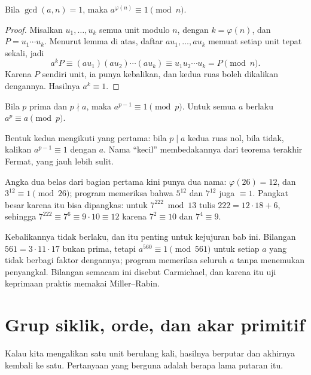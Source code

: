 \begin{teorema}[Euler]
Bila $\gcd(a,n)=1$, maka $a^{\varphi(n)}\equiv1\pmod n$.
\end{teorema}

\begin{proof}
Misalkan $u_1,\dots,u_k$ semua unit modulo $n$, dengan $k=\varphi(n)$, dan $P=u_1\cdots u_k$.
Menurut lemma di atas, daftar $au_1,\dots,au_k$ memuat setiap unit tepat sekali, jadi
\[
a^kP\equiv(au_1)(au_2)\cdots(au_k)\equiv u_1u_2\cdots u_k=P\pmod n .
\]
Karena $P$ sendiri unit, ia punya kebalikan, dan kedua ruas boleh dikalikan dengannya.
Hasilnya $a^k\equiv1$.
\end{proof}

\begin{akibat}
Bila $p$ prima dan $p\nmid a$, maka $a^{p-1}\equiv1\pmod p$. Untuk semua $a$ berlaku
$a^p\equiv a\pmod p$.
\end{akibat}

Bentuk kedua mengikuti yang pertama: bila $p\mid a$ kedua ruas nol, bila tidak, kalikan
$a^{p-1}\equiv1$ dengan $a$. Nama ``kecil'' membedakannya dari teorema terakhir Fermat, yang jauh lebih sulit.

Angka dua belas dari bagian pertama kini punya dua nama: $\varphi(26)=12$, dan
$3^{12}\equiv1\pmod{26}$; program memeriksa bahwa $5^{12}$ dan $7^{12}$ juga $\equiv1$.
Pangkat besar karena itu bisa dipangkas: untuk $7^{222}\bmod13$ tulis $222=12\cdot18+6$,
sehingga $7^{222}\equiv7^6\equiv9\cdot10\equiv12$ karena $7^2\equiv10$ dan $7^4\equiv9$.

Kebalikannya tidak berlaku, dan itu penting untuk kejujuran bab ini. Bilangan $561=3\cdot11\cdot17$
bukan prima, tetapi $a^{560}\equiv1\pmod{561}$ untuk setiap $a$ yang tidak berbagi faktor
dengannya; program memeriksa seluruh $a$ tanpa menemukan penyangkal. Bilangan semacam ini
disebut Carmichael, dan karena itu uji keprimaan praktis memakai Miller--Rabin.


\section{Grup siklik, orde, dan akar primitif}

Kalau kita mengalikan satu unit berulang kali, hasilnya berputar dan akhirnya kembali ke satu.
Pertanyaan yang berguna adalah berapa lama putaran itu.

